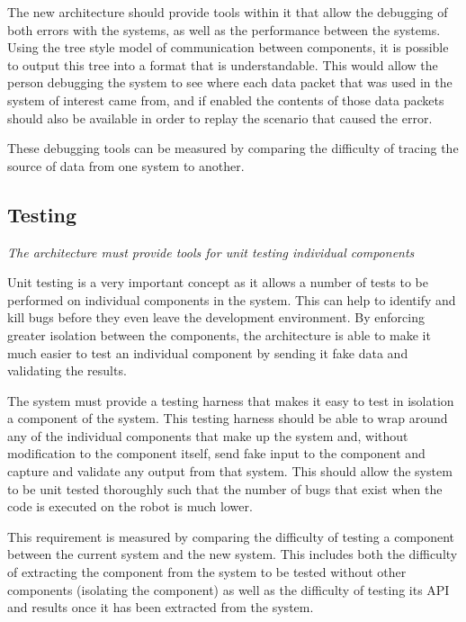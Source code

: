 \documentclass[english,12pt]{scrartcl}
\newcommand{\requirement}[1]{\textit{#1}}
\begin{document}
            The new architecture should provide tools within it that allow the debugging of both
            errors with the systems, as well as the performance between the systems. Using the tree
            style model of communication between components, it is possible to output this tree into
            a format that is understandable. This would allow the person debugging the system to see
            where each data packet that was used in the system of interest came from, and if enabled
            the contents of those data packets should also be available in order to replay the
            scenario that caused the error.
            
            These debugging tools can be measured by comparing the difficulty of tracing the source
            of data from one system to another.
            

        \subsection{Testing}
            \requirement{The architecture must provide tools for unit testing individual components}
            
            Unit testing is a very important concept as it allows a number of tests to be performed
            on individual components in the system. This can help to identify and kill bugs before
            they even leave the development environment. By enforcing greater isolation between the
            components, the architecture is able to make it much easier to test an individual
            component by sending it fake data and validating the results.
            
            The system must provide a testing harness that makes it easy to test in isolation a
            component of the system. This testing harness should be able to wrap around any of the
            individual components that make up the system and, without modification to the component 
            itself, send fake input to the component and capture and validate any output from that
            system. This should allow the system to be unit tested thoroughly such that the number
            of bugs that exist when the code is executed on the robot is much lower.
            
            This requirement is measured by comparing the difficulty of testing a component between
            the current system and the new system. This includes both the difficulty of extracting
            the component from the system to be tested without other components (isolating the
            component) as well as the difficulty of testing its API and results once it has been
            extracted from the system. 
        
\end{document}
